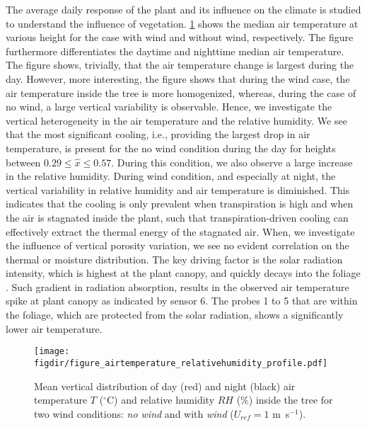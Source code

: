 The average daily response of the plant and its influence on the climate is studied to understand the influence of vegetation. \cref{fig:figure_airtemperature_relativehumidity_profile} shows the median air temperature at various height for the case with wind and without wind, respectively. The figure furthermore differentiates the daytime and nighttime median air temperature. The figure shows, trivially, that the air temperature change is largest during the day. However, more interesting, the figure shows that during the wind case, the air temperature inside the tree is more homogenized, whereas, during the case of no wind, a large vertical variability is observable. Hence, we investigate the vertical heterogeneity in the air temperature and the relative humidity. We see that the most significant cooling, i.e., providing the largest drop in air temperature, is present for the no wind condition during the day for heights between $0.29\le\hat{x}\le0.57$. During this condition, we also observe a large increase in the relative humidity. During wind condition, and especially at night, the vertical variability in relative humidity and air temperature is diminished. This indicates that the cooling is only prevalent when transpiration is high and when the air is stagnated inside the plant, such that transpiration-driven cooling can effectively extract the thermal energy of the stagnated air. When, we investigate the influence of vertical porosity variation, we see no evident correlation on the thermal or moisture distribution. The key driving factor is the solar radiation intensity, which is highest at the plant canopy, and quickly decays into the foliage \citep{Manickathan2018a}. Such gradient in radiation absorption, results in the observed air temperature spike at plant canopy as indicated by sensor 6. The probes 1 to 5 that are within the foliage, which are protected from the solar radiation, shows a significantly lower air temperature.

	\begin{figure}[t]
	\centering
	\texttt{[image: \\figdir/figure\_airtemperature\_relativehumidity\_profile.pdf]}
	\caption{Mean vertical distribution of day (red) and night (black)  air temperature $T$ ($^{\circ}$C) and  relative humidity $RH$ (\%) inside the tree for two wind conditions:  \textit{no wind} and  with \textit{wind} ($U_{ref}=1$ m~s$^{-1}$).}
	\label{fig:figure_airtemperature_relativehumidity_profile}
	\end{figure}


